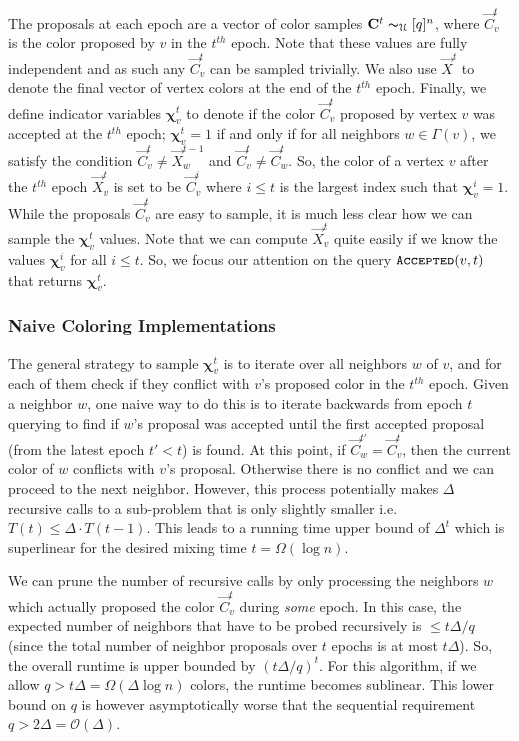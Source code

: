 The proposals at each epoch are a vector of color samples $\vec C^{t} \thicksim_{\mathcal U} [q]^n$,
where $\vec C^t_v$ is the color proposed by $v$ in the $t^{th}$ epoch.
Note that these values are fully independent and as such any $\vec C^t_v$ can be sampled trivially.
We also use $\vec X^t$ to denote the final vector of vertex colors at the end of the $t^{th}$ epoch.
Finally, we define indicator variables $\bm \chi^t_v$ to denote if the color $\vec C^t_v$ proposed by vertex $v$ was accepted at the $t^{th}$ epoch;
$\bm \chi^t_v = 1$ if and only if for all neighbors $w\in \Gamma(v)$,
we satisfy the condition $\vec C^t_v\not= \vec X^{t-1}_w$ and $\vec C^t_v\not= \vec C^t_w$.
So, the color of a vertex $v$ after the $t^{th}$ epoch $\vec X^t_v$ is set to be $\vec C^i_v$
where $i\le t$ is the largest index such that $\bm \chi^i_v=1$.
While the proposals $\vec C^t_v$ are easy to sample, it is much less clear how we can sample the $\bm \chi^t_v$ values.
Note that we can compute $\vec X^t_v$ quite easily if we know the values $\bm\chi^i_v$ for all $i\le t$.
So, we focus our attention on the query $\func{Accepted}(v,t)$ that returns $\bm\chi^t_v$.


\subsubsection{Naive Coloring Implementations}%
\label{sec:naive_coloring_implementations}
The general strategy to sample $\bm\chi^t_v$ is to iterate over all neighbors $w$ of $v$,
and for each of them check if they conflict with $v$'s proposed color in the $t^{th}$ epoch.
Given a neighbor $w$, one naive way to do this is to iterate backwards from epoch $t$ querying to find if $w$'s proposal was accepted
until the first accepted proposal (from the latest epoch $t' < t$) is found.
At this point, if $\vec C^{t'}_w =\vec C^t_v$, then the current color of $w$ conflicts with $v$'s proposal.
Otherwise there is no conflict and we can proceed to the next neighbor.
However, this process potentially makes $\Delta$ recursive calls to a sub-problem that is only slightly smaller i.e. $T(t) \le \Delta\cdot T(t-1)$.
This leads to a running time upper bound of $\Delta^{t}$ which is superlinear for the desired mixing time $t = \Omega(\log n)$.

We can prune the number of recursive calls by only processing the neighbors $w$ which actually proposed the color $\vec C^t_v$ during \emph{some} epoch.
In this case, the expected number of neighbors that have to be probed recursively is $\le t\Delta/q$
(since the total number of neighbor proposals over $t$ epochs is at most $t\Delta$).
So, the overall runtime is upper bounded by $(t\Delta/q)^{t}$.
For this algorithm, if we allow $q > t\Delta = \Omega(\Delta\log n)$ colors, the runtime becomes sublinear.
This lower bound on $q$ is however asymptotically worse that the sequential requirement $q > 2\Delta = \mathcal O(\Delta)$.



